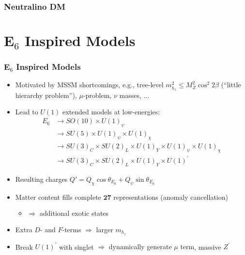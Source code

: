 \documentclass[10pt,aspectratio=169]{beamer}
\begin{document}
\begin{frame}
  \frametitle{Neutralino DM}
\end{frame}

\section{E$_6$ Inspired Models}

\begin{frame}
  \frametitle{E$_6$ Inspired Models}
  \begin{itemize} \itemsep1em
    \item Motivated by MSSM shortcomings, e.g., tree-level $m_{h_1}^2
      \leq M_Z^2 \cos^2 2\beta$ (\alert{``little hierarchy problem''}),
      \alert{$\mu$-problem}, $\nu$ masses, $\ldots$
    \item Lead to $U(1)$ extended models at low-energies:
      \begin{align*}
        E_6&\longrightarrow SO(10)\times U(1)_\psi \\
        &\longrightarrow SU(5)\times U(1)_\psi\times U(1)_\chi\\
        &\longrightarrow SU(3)_C\times SU(2)_L\times U(1)_Y\times
        U(1)_\psi\times U(1)_\chi\\
        &\longrightarrow SU(3)_C\times SU(2)_L\times U(1)_Y\times
        U(1)^\prime
      \end{align*}
    \item Resulting charges $Q' = Q_\chi \cos \theta_{E_6}
      + Q_\psi \sin \theta_{E_6}$
    \item Matter content fills complete $\mathbf{27}$ representations
      (anomaly cancellation)
      \begin{itemize}
      \item $\Rightarrow$ additional exotic states
      \end{itemize}
    \item Extra $D$- and $F$-terms $\Rightarrow$ {\color{blue}
      larger $m_{h_1}$}
    \item Break $U(1)^\prime$ with singlet $\Rightarrow$ {\color{blue}
      dynamically generate $\mu$ term}, massive $Z^\prime$
  \end{itemize}
\end{frame}
\end{document}
